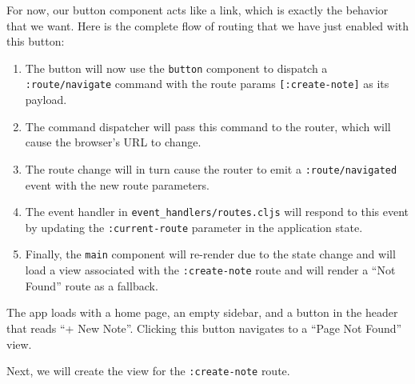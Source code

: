 \documentclass[10pt,twoside,openright]{memoir}
\begin{document}
For now, our button component acts like a link, which is exactly the
behavior that we want. Here is the complete flow of routing that we have
just enabled with this button:

\begin{enumerate}
\def\labelenumi{\arabic{enumi}.}
\tightlist
\item
  The button will now use the \texttt{button} component to dispatch a
  \texttt{:route/navigate} command with the route params
  \texttt{{[}:create-note{]}} as its payload.
\item
  The command dispatcher will pass this command to the router, which
  will cause the browser's URL to change.
\item
  The route change will in turn cause the router to emit a
  \texttt{:route/navigated} event with the new route parameters.
\item
  The event handler in \texttt{event\_handlers/routes.cljs} will respond
  to this event by updating the \texttt{:current-route} parameter in the
  application state.
\item
  Finally, the \texttt{main} component will re-render due to the state
  change and will load a view associated with the \texttt{:create-note}
  route and will render a ``Not Found'' route as a fallback.
\end{enumerate}

\begin{notice}[title={Checkpoint}]
The app loads with a home page, an empty sidebar, and a button in the
header that reads ``+ New Note''. Clicking this button navigates to a
``Page Not Found'' view.
\end{notice}

Next, we will create the view for the \texttt{:create-note} route.
\end{document}
